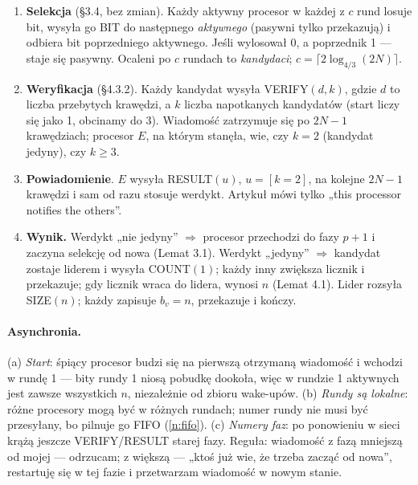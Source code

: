 \documentclass[11pt,a4paper]{article}
\theoremstyle{definition}
\newcommand{\msg}[1]{\textsf{\small #1}}
\begin{document}
\begin{enumerate}[label=\textbf{\arabic*.}]
\item \textbf{Selekcja} (§3.4, bez zmian). Każdy aktywny procesor w każdej z $c$ rund losuje bit,
  wysyła go \msg{BIT} do następnego \emph{aktywnego} (pasywni tylko przekazują) i odbiera bit poprzedniego
  aktywnego. Jeśli wylosował 0, a poprzednik 1 — staje się pasywny. Ocaleni po $c$ rundach to
  \emph{kandydaci}; $c=\lceil2\log_{4/3}(2N)\rceil$.
\item \textbf{Weryfikacja} (§4.3.2). Każdy kandydat wysyła \msg{VERIFY}$(d,k)$, gdzie $d$ to liczba
  przebytych krawędzi, a $k$ liczba napotkanych kandydatów (start liczy się jako 1, obcinamy do 3).
  Wiadomość zatrzymuje się po $2N-1$ krawędziach; procesor $E$, na którym stanęła, wie, czy
  $k=2$ (kandydat jedyny), czy $k\ge3$.
\item \textbf{Powiadomienie}. $E$ wysyła \msg{RESULT}$(u)$, $u=[k=2]$, na kolejne $2N-1$ krawędzi
  i sam od razu stosuje werdykt. Artykuł mówi tylko „this processor notifies the others”.
\item \textbf{Wynik.} Werdykt „nie jedyny” $\Rightarrow$ procesor przechodzi do fazy $p+1$ i zaczyna
  selekcję od nowa (Lemat 3.1). Werdykt „jedyny” $\Rightarrow$ kandydat zostaje liderem i wysyła
  \msg{COUNT}$(1)$; każdy inny zwiększa licznik i przekazuje; gdy licznik wraca do lidera, wynosi $n$
  (Lemat 4.1). Lider rozsyła \msg{SIZE}$(n)$; każdy zapisuje $b_v=n$, przekazuje i kończy.
\end{enumerate}

\paragraph{Asynchronia.} (a) \emph{Start}: śpiący procesor budzi się na pierwszą otrzymaną wiadomość
i wchodzi w rundę 1 — bity rundy 1 niosą pobudkę dookoła, więc w rundzie 1 aktywnych jest zawsze
wszystkich $n$, niezależnie od zbioru wake-upów. (b) \emph{Rundy są lokalne}: różne procesory mogą być
w różnych rundach; numer rundy nie musi być przesyłany, bo pilnuje go FIFO (\ref{n:fifo}).
(c) \emph{Numery faz}: po ponowieniu w sieci krążą jeszcze \msg{VERIFY}/\msg{RESULT} starej fazy. Reguła:
wiadomość z fazą mniejszą od mojej — odrzucam; z większą — „ktoś już wie, że trzeba zacząć od nowa”,
restartuję się w tej fazie i przetwarzam wiadomość w nowym stanie.
\end{document}
